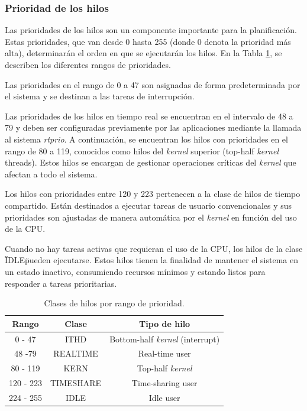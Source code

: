 \subsubsection{Prioridad de los hilos}

Las prioridades de los hilos son un componente importante para la planificación. Estas prioridades, que van desde 0 hasta 255 (donde 0 denota la prioridad más alta), determinarán el orden en que se ejecutarán los hilos. En la Tabla \ref{tabla:prio-hilos}, se describen los diferentes rangos de prioridades.

Las prioridades en el rango de 0 a 47 son asignadas de forma predeterminada por el sistema y se destinan a las tareas de interrupción.\par

Las prioridades de los hilos en tiempo real se encuentran en el intervalo de 48 a 79 y deben ser configuradas previamente por las aplicaciones mediante la llamada al sistema \textit{rtprio}. A continuación, se encuentran los hilos con prioridades en el rango de 80 a 119, conocidos como hilos del \textit{kernel} superior (top-half \textit{kernel} threads). Estos hilos se encargan de gestionar operaciones críticas del \textit{kernel} que afectan a todo el sistema.\par

Los hilos con prioridades entre 120 y 223 pertenecen a la clase de hilos de tiempo compartido. Están destinados a ejecutar tareas de usuario convencionales y sus prioridades son ajustadas de manera automática por el \textit{kernel} en función del uso de la CPU.\par

Cuando no hay tareas activas que requieran el uso de la CPU, los hilos de la clase \"IDLE\" pueden ejecutarse. Estos hilos tienen la finalidad de mantener el sistema en un estado inactivo, consumiendo recursos mínimos y estando listos para responder a tareas prioritarias.\par

\begin{table}[H]
    \centering
    \begin{tabular}{|c|c|c|}
        \hline
        \textbf{Rango} & \textbf{Clase} & \textbf{Tipo de hilo}          \\
        \hline
        0 - 47         & ITHD           & Bottom-half \textit{kernel} (interrupt) \\
        \hline
        48 -79         & REALTIME       & Real-time user                 \\
        \hline
        80 - 119       & KERN           & Top-half \textit{kernel}                \\
        \hline
        120 - 223      & TIMESHARE      & Time-sharing user              \\
        \hline
        224 - 255      & IDLE           & Idle user                      \\
        \hline
    \end{tabular}
    \caption{Clases de hilos por rango de prioridad.}
    \label{tabla:prio-hilos}
\end{table}



